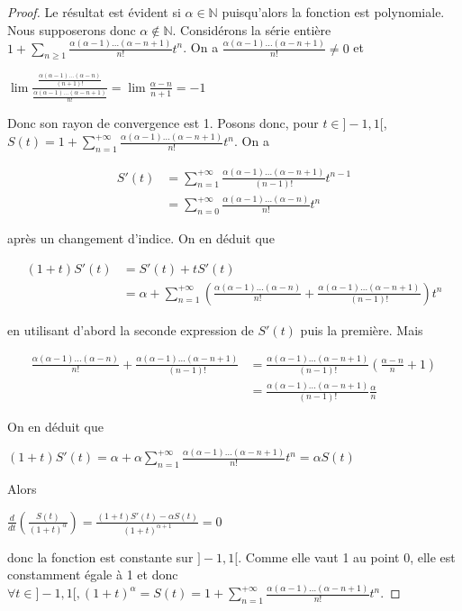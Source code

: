 \begin{proof}
Le résultat est évident si $\alpha \in \mathbb{N}$ puisqu'alors la fonction est polynomiale. Nous supposerons donc $\alpha \notin \mathbb{N}$. Considérons la série entière $1 + \sum_{n \geq 1} \frac{\alpha(\alpha-1)\ldots(\alpha-n+1)}{n!} t^n$. On a $\frac{\alpha(\alpha-1)\ldots(\alpha-n+1)}{n!} \neq 0$ et

$\lim \frac{\frac{\alpha(\alpha-1)\ldots(\alpha-n)}{(n+1)!}}{\frac{\alpha(\alpha-1)\ldots(\alpha-n+1)}{n!}} = \lim \frac{\alpha-n}{n+1} = -1$

Donc son rayon de convergence est 1. Posons donc, pour $t \in ]-1,1[$, $S(t) = 1 + \sum_{n=1}^{+\infty} \frac{\alpha(\alpha-1)\ldots(\alpha-n+1)}{n!} t^n$. On a

\begin{align*}
S'(t) &= \sum_{n=1}^{+\infty} \frac{\alpha(\alpha-1)\ldots(\alpha-n+1)}{(n-1)!} t^{n-1} \\
&= \sum_{n=0}^{+\infty} \frac{\alpha(\alpha-1)\ldots(\alpha-n)}{n!} t^n
\end{align*}

après un changement d'indice. On en déduit que

\begin{align*}
(1+t)S'(t) &= S'(t) + tS'(t) \\
&= \alpha + \sum_{n=1}^{+\infty} \left(\frac{\alpha(\alpha-1)\ldots(\alpha-n)}{n!} + \frac{\alpha(\alpha-1)\ldots(\alpha-n+1)}{(n-1)!}\right)t^n
\end{align*}

en utilisant d'abord la seconde expression de $S'(t)$ puis la première. Mais

\begin{align*}
\frac{\alpha(\alpha-1)\ldots(\alpha-n)}{n!} + \frac{\alpha(\alpha-1)\ldots(\alpha-n+1)}{(n-1)!} &= \frac{\alpha(\alpha-1)\ldots(\alpha-n+1)}{(n-1)!} \left(\frac{\alpha-n}{n} + 1\right) \\
&= \frac{\alpha(\alpha-1)\ldots(\alpha-n+1)}{(n-1)!} \frac{\alpha}{n}
\end{align*}

On en déduit que

$(1+t)S'(t) = \alpha + \alpha \sum_{n=1}^{+\infty} \frac{\alpha(\alpha-1)\ldots(\alpha-n+1)}{n!} t^n = \alpha S(t)$

Alors

$\frac{d}{dt} \left(\frac{S(t)}{(1+t)^\alpha}\right) = \frac{(1+t)S'(t) - \alpha S(t)}{(1+t)^{\alpha+1}} = 0$

donc la fonction est constante sur $]-1,1[$. Comme elle vaut 1 au point 0, elle est constamment égale à 1 et donc $\forall t \in ]-1,1[, (1+t)^\alpha = S(t) = 1 + \sum_{n=1}^{+\infty} \frac{\alpha(\alpha-1)\ldots(\alpha-n+1)}{n!} t^n$.
\end{proof}

